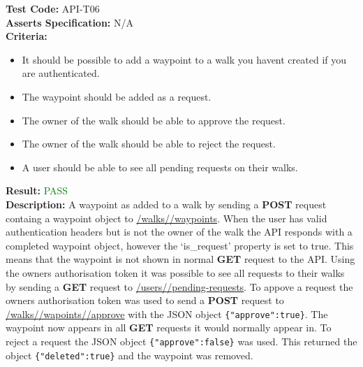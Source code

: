 \documentclass[11pt,a4paper]{report}
\begin{document}
\label{test:API-T06}
\noindent\textbf{Test Code:} API-T06\\
\textbf{Asserts Specification:} N/A \\ 
\textbf{Criteria:} \begin{itemize}
                     \item It should be possible to add a waypoint to a walk you havent created if you are authenticated. 
                     \item The waypoint should be added as a request.
                     \item The owner of the walk should be able to approve the request.
                     \item The owner of the walk should be able to reject the request.
                     \item A user should be able to see all pending requests on their walks.
                   \end{itemize}  
                   
\textbf{Result:} \textcolor{green}{PASS}\\ 
\textbf{Description:} A waypoint as added to a walk by sending a \textbf{POST} request containg a waypoint object to \url{/walks/}\url{/waypoints}. When the user has valid authentication headers but is not the owner of the walk the API responds with a completed waypoint object, however the `is\_request' property is set to true. This means that the waypoint is not shown in normal \textbf{GET} request to the API. Using the owners authorisation token it was possible to see all requests to their walks by sending a \textbf{GET} request to \url{/users/}\url{/pending-requests}. To appove a request the owners authorisation token was used to send a \textbf{POST} request to \url{/walks/}\url{/wapoints/}\url{/approve} with the JSON object \lstinline${"approve":true}$. The waypoint now appears in all \textbf{GET} requests it would normally appear in. To reject a request the JSON object \lstinline${"approve":false}$ was used. This returned the object \lstinline${"deleted":true}$ and the waypoint was removed.\\
\end{document}
